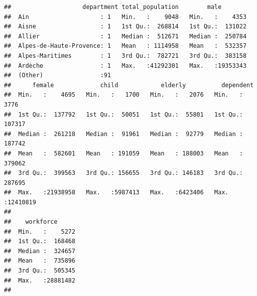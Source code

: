 \documentclass[]{article}
\newenvironment{Shaded}{\begin{snugshade}}{\end{snugshade}}
\newcommand{\KeywordTok}[1]{\textcolor[rgb]{0.13,0.29,0.53}{\textbf{#1}}}
\newcommand{\StringTok}[1]{\textcolor[rgb]{0.31,0.60,0.02}{#1}}
\newcommand{\CommentTok}[1]{\textcolor[rgb]{0.56,0.35,0.01}{\textit{#1}}}
\newcommand{\OperatorTok}[1]{\textcolor[rgb]{0.81,0.36,0.00}{\textbf{#1}}}
\newcommand{\NormalTok}[1]{#1}
\begin{document}
\begin{verbatim}
##                    department total_population        male         
##  Ain                    : 1   Min.   :    9048   Min.   :    4353  
##  Aisne                  : 1   1st Qu.:  268814   1st Qu.:  131022  
##  Allier                 : 1   Median :  512671   Median :  250784  
##  Alpes-de-Haute-Provence: 1   Mean   : 1114958   Mean   :  532357  
##  Alpes-Maritimes        : 1   3rd Qu.:  782721   3rd Qu.:  383158  
##  Ardèche                : 1   Max.   :41292301   Max.   :19353343  
##  (Other)                :91                                        
##      female             child            elderly          dependent       
##  Min.   :    4695   Min.   :   1700   Min.   :   2076   Min.   :    3776  
##  1st Qu.:  137792   1st Qu.:  50051   1st Qu.:  55801   1st Qu.:  107317  
##  Median :  261218   Median :  91961   Median :  92779   Median :  187742  
##  Mean   :  582601   Mean   : 191059   Mean   : 188003   Mean   :  379062  
##  3rd Qu.:  399563   3rd Qu.: 156655   3rd Qu.: 146183   3rd Qu.:  287695  
##  Max.   :21938958   Max.   :5987413   Max.   :6423406   Max.   :12410819  
##                                                                           
##    workforce       
##  Min.   :    5272  
##  1st Qu.:  168468  
##  Median :  324657  
##  Mean   :  735896  
##  3rd Qu.:  505345  
##  Max.   :28881482  
## 
\end{verbatim}

\begin{Shaded}
\end{Shaded}

\begin{Shaded}
\end{Shaded}
\end{document}
